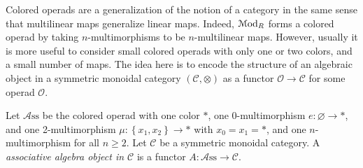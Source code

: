 \begin{intuition}\label{1.2.5}
	Colored operads are a generalization of the notion of a category in the same sense that multilinear maps generalize linear maps. Indeed, $\mathcal{M}\mathrm{od} _R$ forms a colored operad by taking $n$-multimorphisms to be $n$-multilinear maps. However, usually it is more useful to consider small colored operads with only one or two colors, and a small number of maps. The idea here is to encode the structure of an algebraic object in a symmetric monoidal category $(\mathcal{C} ,\otimes )$ as a functor $\mathcal{O} \to \mathcal{C} $ for some operad $\mathcal{O} $.
\end{intuition}

\begin{definition}\label{1.2.6}
	Let $\mathcal{A} \mathrm{ss} $ be the colored operad with one color $*$, one 0-multimorphism $e:\varnothing \to *$, and one 2-multimorphism $\mu : \left\{ x_1,x_2 \right\}  \to *$ with $x_0=x_1=*$, and one $n$-multimorphism for all $n\geq 2$. Let $\mathcal{C}$ be a symmetric monoidal category. A \emph{associative algebra object in $\mathcal{C} $} is a functor $A:\mathcal{A} \mathrm{ss} \to \mathcal{C} $.
\end{definition}

